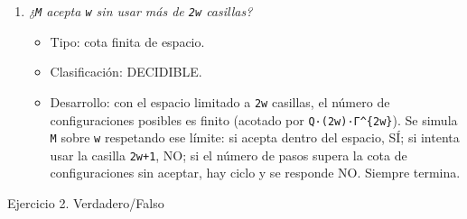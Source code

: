 \documentclass[12pt]{book} %
\providecommand{\tightlist}{%
  \setlength{\itemsep}{0pt}\setlength{\parskip}{0pt}}
\begin{document}
\begin{enumerate}
  \begin{itemize}
  \tightlist
  \item
    Tipo: conjunción de ``al menos 3'' (existencial, r.e.) y ``como
    mucho 3'' (universal sobre el resto, co-r.e.).
  \item
    Clasificación: NO SEMIDECIDIBLE.
  \item
    Desarrollo: ``como mucho 3'' exige garantizar que ninguna otra
    palabra es aceptada, lo cual no es r.e. (es una condición universal
    sobre infinitas palabras, emparentada con el complementario del
    problema de no vacuidad). La intersección de un r.e. con un problema
    que no es r.e. no es r.e. Se prueba reduciendo un problema no
    semidecidible (del tipo EMPTY ampliado): se construye una máquina
    que acepta 3 palabras testigo fijas y, además, simula \texttt{M}
    para añadir aceptaciones; el resultado tiene exactamente 3 palabras
    si y solo si \texttt{M} no acepta ninguna, que es EMPTY.
  \end{itemize}
\item
  \emph{¿\texttt{M} acepta \texttt{w} sin usar más de
  \texttt{2\textbar{}w\textbar{}} casillas?}

  \begin{itemize}
  \tightlist
  \item
    Tipo: cota finita de espacio.
  \item
    Clasificación: DECIDIBLE.
  \item
    Desarrollo: con el espacio limitado a
    \texttt{2\textbar{}w\textbar{}} casillas, el número de
    configuraciones posibles es finito (acotado por
    \texttt{\textbar{}Q\textbar{}·(2\textbar{}w\textbar{})·\textbar{}Γ\textbar{}\^{}\{2\textbar{}w\textbar{}\}}).
    Se simula \texttt{M} sobre \texttt{w} respetando ese límite: si
    acepta dentro del espacio, SÍ; si intenta usar la casilla
    \texttt{2\textbar{}w\textbar{}+1}, NO; si el número de pasos supera
    la cota de configuraciones sin aceptar, hay ciclo y se responde NO.
    Siempre termina.
  \end{itemize}
\end{enumerate}

Ejercicio 2. Verdadero/Falso
\end{document}
